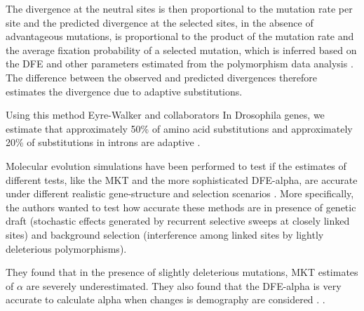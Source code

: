 The divergence at the neutral sites is then proportional to the mutation rate per site and the predicted divergence at the selected sites, in the absence of advantageous mutations, 
is proportional to the product of the mutation rate and the average fixation probability of a selected mutation, 
which is inferred based on the DFE and other parameters estimated from the polymorphism data analysis
	\citep{Eyre-Walker2009}.
The difference between the observed and predicted divergences therefore estimates the divergence due to adaptive substitutions.

Using this method Eyre-Walker and collaborators 
In Drosophila genes, we estimate
that approximately 50\% of amino acid substitutions and approximately 20\% of substitutions in introns are adaptive
	\citep{Eyre-Walker2009}.

Molecular evolution simulations have been performed to test if the estimates of different tests, like the MKT and the more sophisticated DFE-alpha, are accurate under different realistic gene-structure and selection scenarios
	\citep{Messer2013}.
More specifically, the authors wanted to test how accurate these methods are in presence of genetic draft (stochastic effects generated by recurrent selective sweeps at closely linked sites)
and background selection (interference among linked sites by lightly deleterious polymorphisms).

They found that in the presence of slightly deleterious mutations, MKT estimates of $\alpha$ are severely underestimated.
They also found that the DFE-alpha is very accurate to calculate alpha when changes is demography are considered
	\citep{Messer2013}.
.



